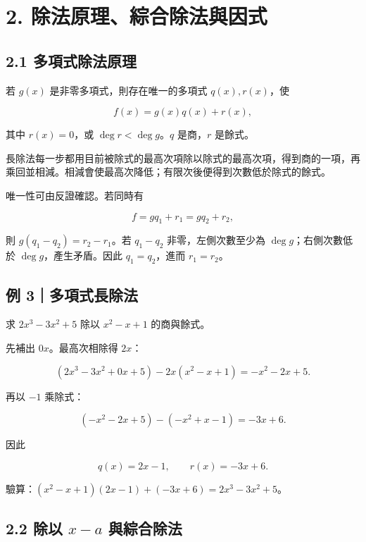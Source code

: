 \documentclass[11pt,a4paper]{article}
\begin{document}
\section{2. 除法原理、綜合除法與因式}\label{ux9664ux6cd5ux539fux7406ux7d9cux5408ux9664ux6cd5ux8207ux56e0ux5f0f}

\subsection{2.1 多項式除法原理}\label{ux591aux9805ux5f0fux9664ux6cd5ux539fux7406}

若 \(g(x)\) 是非零多項式，則存在唯一的多項式 \(q(x),r(x)\)，使

\[
\boxed{f(x)=g(x)q(x)+r(x)},
\]

其中 \(r(x)=0\)，或 \(\deg r<\deg g\)。\(q\) 是商，\(r\) 是餘式。

長除法每一步都用目前被除式的最高次項除以除式的最高次項，得到商的一項，再乘回並相減。相減會使最高次降低；有限次後便得到次數低於除式的餘式。

唯一性可由反證確認。若同時有

\[
f=gq_1+r_1=gq_2+r_2,
\]

則 \(g(q_1-q_2)=r_2-r_1\)。若 \(q_1-q_2\) 非零，左側次數至少為 \(\deg g\)；右側次數低於 \(\deg g\)，產生矛盾。因此 \(q_1=q_2\)，進而 \(r_1=r_2\)。

\subsection{例 3｜多項式長除法}\label{ux4f8b-3ux591aux9805ux5f0fux9577ux9664ux6cd5}

求 \(2x^3-3x^2+5\) 除以 \(x^2-x+1\) 的商與餘式。

先補出 \(0x\)。最高次相除得 \(2x\)：

\[
(2x^3-3x^2+0x+5)-2x(x^2-x+1)=-x^2-2x+5.
\]

再以 \(-1\) 乘除式：

\[
(-x^2-2x+5)-(-x^2+x-1)=-3x+6.
\]

因此

\[
\boxed{q(x)=2x-1,\qquad r(x)=-3x+6}.
\]

驗算：\((x^2-x+1)(2x-1)+(-3x+6)=2x^3-3x^2+5\)。

\subsection{\texorpdfstring{2.2 除以 \(x-a\) 與綜合除法}{2.2 除以 x-a 與綜合除法}}\label{ux9664ux4ee5-x-a-ux8207ux7d9cux5408ux9664ux6cd5}
\end{document}
